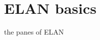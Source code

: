 \documentclass{beamer}
\begin{document}
  \section{ELAN basics}
    \begin{frame}{the panes of ELAN}
       \begin{figure}[htbp]
       \begin{center}
         \setlength\fboxsep{0pt}
         \setlength\fboxrule{0pt}
      \end{center}
      \end{figure}
    \end{frame}
    
\end{document}
